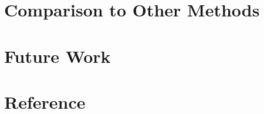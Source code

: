 \documentclass[nohyperref]{article}
\theoremstyle{plain}
\theoremstyle{definition}
\theoremstyle{remark}
\newcommand{\cnote}[1]{\textsf{\color{blue} [#1]}}
\begin{document}
\section{Comparison to Other Methods}

\section{Future Work}






\section*{Reference}



\end{document}
